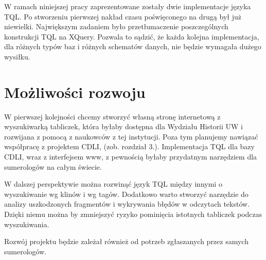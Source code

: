 W ramach niniejszej pracy zaprezentowane zostały dwie implementacje języka TQL. 
Po stworzeniu pierwszej nakład czasu poświęconego na drugą był już niewielki. 
Największym zadaniem było przetłumaczenie poszczególnych konstrukcji TQL na XQuery. 
Pozwala to sądzić, że każda kolejna implementacja, dla różnych typów baz i różnych schematów danych, 
nie będzie wymagała dużego wysiłku. 



\section*{Możliwości rozwoju}
W pierwszej kolejności chcemy stworzyć własną stronę internetową z wyszukiwarką tabliczek, 
która byłaby dostępna dla Wydziału Historii UW i rozwijana z pomocą z naukowców z tej instytucji. 
Poza tym planujemy nawiązać współpracę z projektem CDLI, (zob. rozdział 3.).
Implementacja TQL dla bazy CDLI, wraz z interfejsem www, z pewnością byłaby przydatnym narzędziem dla sumerologów na całym świecie.

W dalszej perspektywie można rozwinąć język TQL między innymi o wyszukiwanie wg klinów i wg tagów. 
Dodatkowo warto stworzyć narzędzie do analizy uszkodzonych fragmentów i wykrywania błędów w odczytach tekstów. 
Dzięki niemu można by zmniejszyć ryzyko pominięcia istotnych tabliczek podczas wyszukiwania. 

Rozwój projektu będzie zależał również od potrzeb zgłaszanych przez samych sumerologów.








